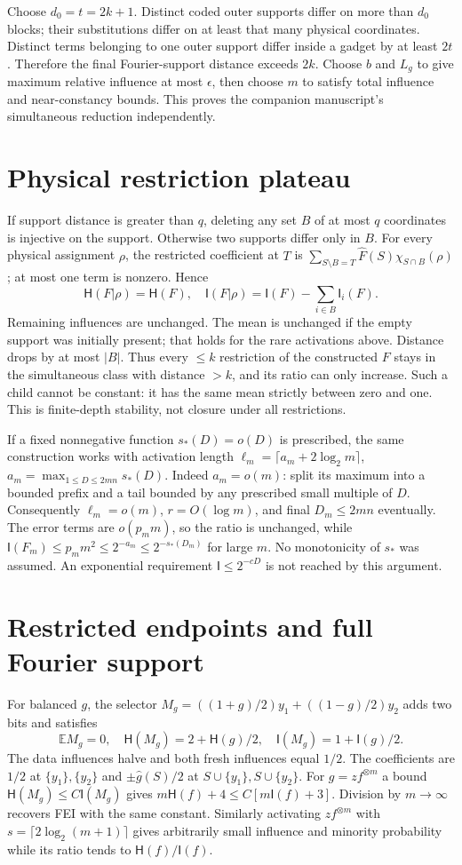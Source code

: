 \documentclass[11pt]{article}
\newcommand{\I}{\mathsf I}\newcommand{\HH}{\mathsf H}
\newcommand{\E}{\mathbb E}
\begin{document}
Choose $d_0=t=2k+1$. Distinct coded outer supports differ on more than $d_0$
blocks; their substitutions differ on at least that many physical coordinates.
Distinct terms belonging to one outer support differ inside a gadget by at least
$2t$. Therefore the final Fourier-support distance exceeds $2k$.
Choose $b$ and $L_g$ to give maximum relative influence at most $\epsilon$,
then choose $m$ to satisfy total influence and near-constancy bounds.
This proves the companion manuscript's simultaneous reduction independently.

\section{Physical restriction plateau}
If support distance is greater than $q$, deleting any set $B$ of at most $q$
coordinates is injective on the support. Otherwise two supports differ only in $B$.
For every physical assignment $\rho$, the restricted coefficient at $T$ is
$\sum_{S\setminus B=T}\widehat F(S)\chi_{S\cap B}(\rho)$; at most one term
is nonzero. Hence
\[
 \HH(F|\rho)=\HH(F),\quad
 \I(F|\rho)=\I(F)-\sum_{i\in B}\I_i(F).
\]
Remaining influences are unchanged. The mean is unchanged if the empty support
was initially present; that holds for the rare activations above. Distance drops
by at most $|B|$. Thus every $\le k$ restriction of the constructed $F$ stays in
the simultaneous class with distance $>k$, and its ratio can only increase.
Such a child cannot be constant: it has the same mean strictly between zero and one.
This is finite-depth stability, not closure under all restrictions.

If a fixed nonnegative function $s_*(D)=o(D)$ is prescribed, the same construction
works with activation length
$\ell_m=\lceil a_m+2\log_2m\rceil$,
$a_m=\max_{1\le D\le2mn}s_*(D)$.
Indeed $a_m=o(m)$: split its maximum into a bounded prefix and a tail bounded
by any prescribed small multiple of $D$. Consequently $\ell_m=o(m)$,
$r=O(\log m)$, and final $D_m\le2mn$ eventually.
The error terms are $o(p_m m)$, so the ratio is unchanged, while
$\I(F_m)\le p_m m^2\le2^{-a_m}\le2^{-s_*(D_m)}$ for large $m$.
No monotonicity of $s_*$ was assumed. An exponential requirement
$\I\le2^{-cD}$ is not reached by this argument.

\section{Restricted endpoints and full Fourier support}
For balanced $g$, the selector
$M_g=((1+g)/2)y_1+((1-g)/2)y_2$ adds two bits and satisfies
\[
 \E M_g=0,\quad\HH(M_g)=2+\HH(g)/2,\quad
 \I(M_g)=1+\I(g)/2.
\]
The data influences halve and both fresh influences equal $1/2$. The coefficients
are $1/2$ at $\{y_1\},\{y_2\}$ and $\pm\widehat g(S)/2$ at
$S\cup\{y_1\},S\cup\{y_2\}$. For $g=z f^{\otimes m}$ a bound
$\HH(M_g)\le C\I(M_g)$ gives $m\HH(f)+4\le C[m\I(f)+3]$.
Division by $m\to\infty$ recovers FEI with the same constant.
Similarly activating $z f^{\otimes m}$ with
$s=\lceil2\log_2(m+1)\rceil$ gives arbitrarily small influence and minority
probability while its ratio tends to $\HH(f)/\I(f)$.
\end{document}
